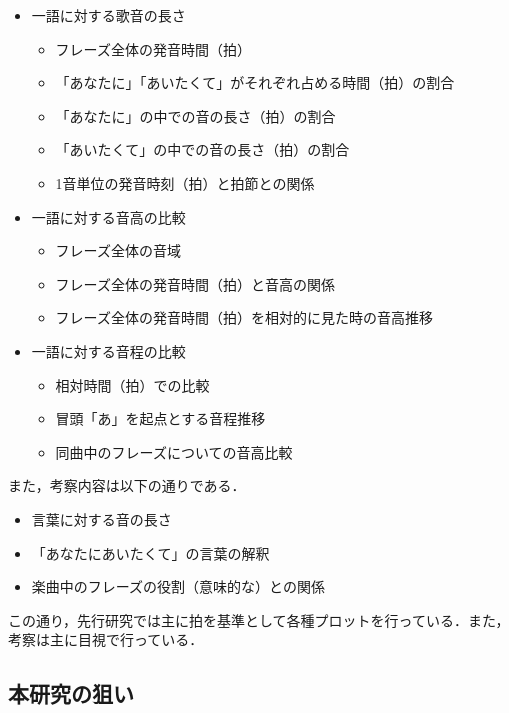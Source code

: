 \begin{itemize}
  \item 一語に対する歌音の長さ
        \begin{itemize}
          \item フレーズ全体の発音時間（拍）
          \item 「あなたに」「あいたくて」がそれぞれ占める時間（拍）の割合
          \item 「あなたに」の中での音の長さ（拍）の割合
          \item 「あいたくて」の中での音の長さ（拍）の割合
          \item 1音単位の発音時刻（拍）と拍節との関係
        \end{itemize}
  \item 一語に対する音高の比較
        \begin{itemize}
          \item フレーズ全体の音域
          \item フレーズ全体の発音時間（拍）と音高の関係
          \item フレーズ全体の発音時間（拍）を相対的に見た時の音高推移
        \end{itemize}
  \item 一語に対する音程の比較
        \begin{itemize}
          \item 相対時間（拍）での比較
          \item 冒頭「あ」を起点とする音程推移
          \item 同曲中のフレーズについての音高比較
        \end{itemize}
\end{itemize}
また，考察内容は以下の通りである．
\begin{itemize}
  \item 言葉に対する音の長さ
  \item 「あなたにあいたくて」の言葉の解釈
  \item 楽曲中のフレーズの役割（意味的な）との関係
\end{itemize}
この通り，先行研究では主に拍を基準として各種プロットを行っている．また，考察は主に目視で行っている．




\subsection{本研究の狙い}

